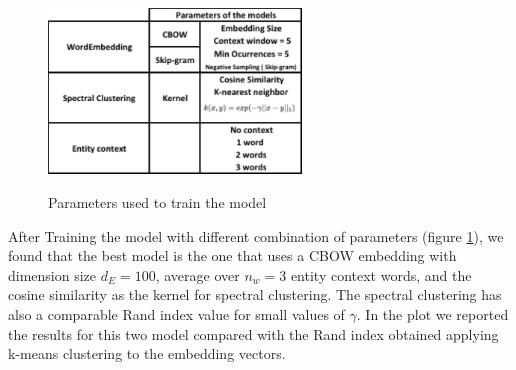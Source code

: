 \documentclass[]{article}
\begin{document}
\begin{figure}[h]
	\caption{Parameters used to train the model}
	\centering
	\includegraphics[width=0.6\textwidth]{Figures_Mik/Parameters.png}
	\label{fig:params}
\end{figure}


After Training the model with different combination of parameters (figure \ref{fig:params}), we found that the best model is the one that uses a CBOW embedding with dimension size $d_E=100$, average over $n_w=3$ entity context words, and the cosine similarity as the kernel for spectral clustering. The spectral clustering has also a comparable Rand index value for small values of $\gamma$. In the plot we reported the results for this two model compared with the Rand index obtained applying k-means clustering to the embedding vectors. 
\end{document}
